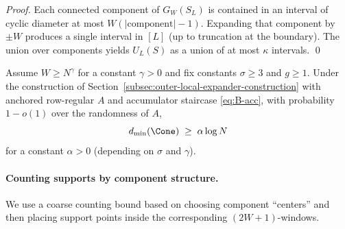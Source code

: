\begin{proof}
Each connected component of $G_W(S_L)$ is contained in an interval of cyclic diameter at most $W(|\text{component}|-1)$.
Expanding that component by $\pm W$ produces a single interval in $[L]$ (up to truncation at the boundary).
The union over components yields $U_L(S)$ as a union of at most $\kappa$ intervals.
\qed
\end{proof}

\begin{theorem}
\label{thm:outer-local-expander-logdist}
Assume $W\ge N^{\gamma}$ for a constant $\gamma>0$ and fix constants $\sigma\ge 3$ and $g\ge 1$.
Under the construction of Section~\ref{subsec:outer-local-expander-construction} with anchored row-regular $A$ and
accumulator staircase \eqref{eq:B-acc}, with probability $1-o(1)$ over the randomness of $A$,
\[
d_{\min}(\Cone)\;\ge\; \alpha\log N
\]
for a constant $\alpha>0$ (depending on $\sigma$ and $\gamma$).
\end{theorem}


%
%

\paragraph{Counting supports by component structure.}
We use a coarse counting bound based on choosing component ``centers'' and then placing support points inside the
corresponding $(2W+1)$-windows.

